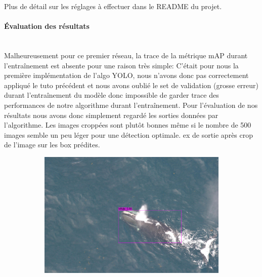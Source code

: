 \documentclass[12pt,a4paper]{report}
\begin{document}
\begin{spacing}{1.5}
\begin{enumerate}
\end{enumerate}

Plus de détail sur les réglages à effectuer dans le README du projet.
\paragraph{Évaluation des résultats}
\\
Malheureusement pour ce premier réseau, la trace de la métrique mAP durant l'entraînement est absente pour une raison très simple: C’était pour nous la première implémentation de l’algo YOLO, nous n’avons donc pas correctement appliqué le tuto précédent et nous avons oublié le set de validation (grosse erreur) durant l'entraînement du modèle donc impossible de garder trace des performances de notre algorithme durant l’entraînement. Pour l'évaluation de nos résultats nous avons donc simplement regardé les sorties données par l'algorithme. Les images croppées sont plutôt bonnes même si le nombre de 500 images semble un peu léger pour une détection optimale.
ex de sortie après crop de l'image sur les box prédites.
\begin{figure}[H] %
\begin{subfigure}{0.45\textwidth}
\includegraphics[width=\linewidth]{figures/sortie/yolov3/predictionsall1.jpg}
\end{subfigure}\hspace*{\fill}
\begin{subfigure}{0.45\textwidth}

\end{subfigure}
\end{figure}
\end{spacing}
\end{document}
